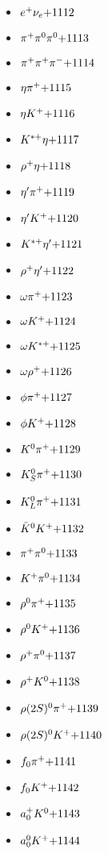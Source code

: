 \begin{multicols}{3}
\begin{itemize}
 \item $ e^{+} \nu_{e} \hfill{+1112}$
 \item $ \pi^{+} \pi^{0} \pi^{0} \hfill{+1113}$
 \item $ \pi^{+} \pi^{+} \pi^{-} \hfill{+1114}$
 \item $ \eta \pi^{+} \hfill{+1115}$
 \item $ \eta K^{+} \hfill{+1116}$
 \item $ K^{*+} \eta \hfill{+1117}$
 \item $ \rho^{+} \eta \hfill{+1118}$
 \item $ {\eta^{\prime}} \pi^{+} \hfill{+1119}$
 \item $ {\eta^{\prime}} K^{+} \hfill{+1120}$
 \item $ K^{*+} {\eta^{\prime}} \hfill{+1121}$
 \item $ \rho^{+} {\eta^{\prime}} \hfill{+1122}$
 \item $ \omega \pi^{+} \hfill{+1123}$
 \item $ \omega K^{+} \hfill{+1124}$
 \item $ \omega K^{*+} \hfill{+1125}$
 \item $ \omega \rho^{+} \hfill{+1126}$
 \item $ \phi \pi^{+} \hfill{+1127}$
 \item $ \phi K^{+} \hfill{+1128}$
 \item $ K^{0} \pi^{+} \hfill{+1129}$
 \item $ K_{S}^{0} \pi^{+} \hfill{+1130}$
 \item $ K_{L}^{0} \pi^{+} \hfill{+1131}$
 \item $ \bar{K}^{0} K^{+} \hfill{+1132}$
 \item $ \pi^{+} \pi^{0} \hfill{+1133}$
 \item $ K^{+} \pi^{0} \hfill{+1134}$
 \item $ \rho^{0} \pi^{+} \hfill{+1135}$
 \item $ \rho^{0} K^{+} \hfill{+1136}$
 \item $ \rho^{+} \pi^{0} \hfill{+1137}$
 \item $ \rho^{+} K^{0} \hfill{+1138}$
 \item $ \rho(2S)^{0} \pi^{+} \hfill{+1139}$
 \item $ \rho(2S)^{0} K^{+} \hfill{+1140}$
 \item $ f_{0} \pi^{+} \hfill{+1141}$
 \item $ f_{0} K^{+} \hfill{+1142}$
 \item $ a_{0}^{+} K^{0} \hfill{+1143}$
 \item $ a_{0}^{0} K^{+} \hfill{+1144}$

\end{itemize}
\end{multicols}
